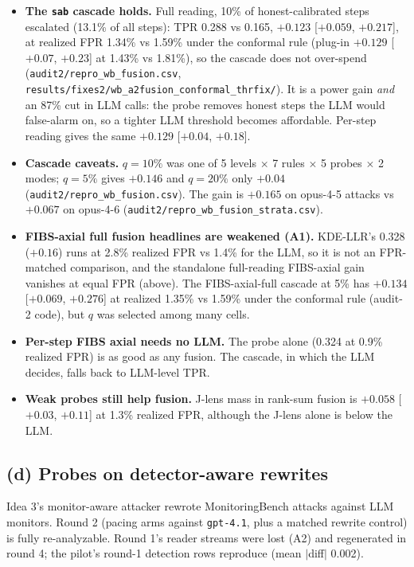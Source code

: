 \documentclass[11pt]{article}
\begin{document}
\begin{itemize}
\item \textbf{The \texttt{sab} cascade holds.} Full reading, 10\% of honest-calibrated steps escalated (13.1\% of all steps): TPR 0.288 vs 0.165, $+0.123$ [$+0.059$, $+0.217$], at realized FPR 1.34\% vs 1.59\% under the conformal rule (plug-in $+0.129$ [$+0.07$, $+0.23$] at 1.43\% vs 1.81\%), so the cascade does not over-spend (\nolinkurl{audit2/repro_wb_fusion.csv}, \nolinkurl{results/fixes2/wb_a2fusion_conformal_thrfix/}). It is a power gain \emph{and} an 87\% cut in LLM calls: the probe removes honest steps the LLM would false-alarm on, so a tighter LLM threshold becomes affordable. Per-step reading gives the same $+0.129$ [$+0.04$, $+0.18$].
\item \textbf{Cascade caveats.} $q=10\%$ was one of 5 levels $\times$ 7 rules $\times$ 5 probes $\times$ 2 modes; $q=5\%$ gives $+0.146$ and $q=20\%$ only $+0.04$ (\nolinkurl{audit2/repro_wb_fusion.csv}). The gain is $+0.165$ on opus-4-5 attacks vs $+0.067$ on opus-4-6 (\nolinkurl{audit2/repro_wb_fusion_strata.csv}).
\item \textbf{FIBS-axial full fusion headlines are weakened (A1).} KDE-LLR's 0.328 ($+0.16$) runs at 2.8\% realized FPR vs 1.4\% for the LLM, so it is not an FPR-matched comparison, and the standalone full-reading FIBS-axial gain vanishes at equal FPR (above). The FIBS-axial-full cascade at 5\% has $+0.134$ [$+0.069$, $+0.276$] at realized 1.35\% vs 1.59\% under the conformal rule (audit-2 code), but $q$ was selected among many cells.
\item \textbf{Per-step FIBS axial needs no LLM.} The probe alone (0.324 at 0.9\% realized FPR) is as good as any fusion. The cascade, in which the LLM decides, falls back to LLM-level TPR.
\item \textbf{Weak probes still help fusion.} J-lens mass in rank-sum fusion is $+0.058$ [$+0.03$, $+0.11$] at 1.3\% realized FPR, although the J-lens alone is below the LLM.
\end{itemize}

\subsection{(d) Probes on detector-aware rewrites}\label{sec:t3}
Idea 3's monitor-aware attacker rewrote MonitoringBench attacks against LLM monitors. Round 2 (pacing arms against \texttt{gpt-4.1}, plus a matched rewrite control) is fully re-analyzable. Round 1's reader streams were lost (A2) and regenerated in round 4; the pilot's round-1 detection rows reproduce (mean $|$diff$|$ 0.002).
\end{document}

